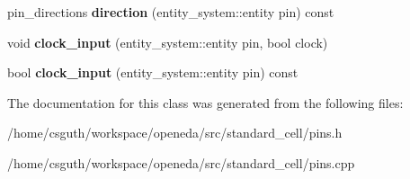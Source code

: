 \begin{DoxyCompactItemize}
\item 
\hypertarget{classophidian_1_1standard__cell_1_1pins_a711f045187c76b64d72829879087a7ae}{pin\-\_\-directions {\bfseries direction} (entity\-\_\-system\-::entity pin) const }\label{classophidian_1_1standard__cell_1_1pins_a711f045187c76b64d72829879087a7ae}

\item 
\hypertarget{classophidian_1_1standard__cell_1_1pins_a6762eae653cb65e03148f37f02b398e3}{void {\bfseries clock\-\_\-input} (entity\-\_\-system\-::entity pin, bool clock)}\label{classophidian_1_1standard__cell_1_1pins_a6762eae653cb65e03148f37f02b398e3}

\item 
\hypertarget{classophidian_1_1standard__cell_1_1pins_a75302d512617ef68cb19c7f5fcf8a941}{bool {\bfseries clock\-\_\-input} (entity\-\_\-system\-::entity pin) const }\label{classophidian_1_1standard__cell_1_1pins_a75302d512617ef68cb19c7f5fcf8a941}

\end{DoxyCompactItemize}


The documentation for this class was generated from the following files\-:\begin{DoxyCompactItemize}
\item 
/home/csguth/workspace/openeda/src/standard\-\_\-cell/pins.\-h\item 
/home/csguth/workspace/openeda/src/standard\-\_\-cell/pins.\-cpp\end{DoxyCompactItemize}
